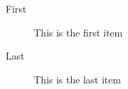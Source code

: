 \documentclass[DIV=calc, paper=a4, fontsize=11pt, twocolumn]{scrartcl}
\begin{document}
\lipsum[8] %

\begin{description}
\item[First] This is the first item
\item[Last] This is the last item
\end{description}

\lipsum[9] %

\fi %





\end{document}

